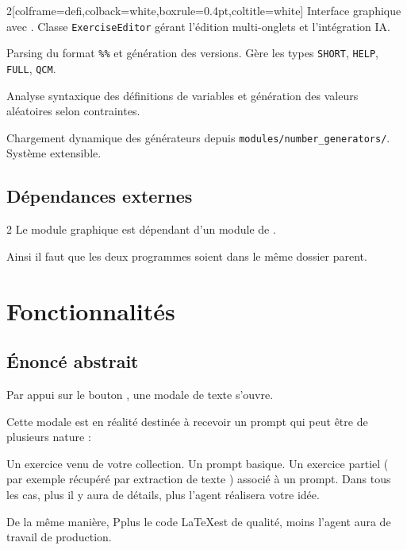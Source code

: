 \begin{MultiColonnes}{2}[colframe=defi,colback=white,boxrule=0.4pt,coltitle=white]
    \tcbitem[title=UI\_v2.py] Interface graphique avec . Classe \texttt{ExerciseEditor} gérant l'édition multi-onglets et l'intégration IA.

    \tcbitem[title=version\_maker.py] Parsing du format \texttt{\%\%} et génération des versions. Gère les types \texttt{SHORT}, \texttt{HELP}, \texttt{FULL}, \texttt{QCM}.

    \tcbitem[title=numbers\_def.py] Analyse syntaxique des définitions de variables et génération des valeurs aléatoires selon contraintes.

    \tcbitem[title=number\_generators\_manager.py] Chargement dynamique des générateurs depuis \texttt{modules/number\_generators/}. Système extensible.
\end{MultiColonnes} 

\subsection{Dépendances externes}

\begin{MultiColonnes}{2}
\tcbitem Le module graphique est dépendant d'un module de . 

Ainsi il faut que les deux programmes soient dans le même dossier parent. 
\tcbitem[halign=left,valign=top] 
\end{MultiColonnes}


\section{Fonctionnalités}

\subsection{\'Enoncé abstrait}

Par appui sur le bouton , une modale de texte s'ouvre. 

Cette modale est en réalité destinée à recevoir un prompt qui peut être de plusieurs nature : 

\begin{tcbenumerate}[2]
    \tcbitem Un exercice venu de votre collection. 
    \tcbitem Un prompt basique. 
    \tcbitem[raster multicolumn=2] Un exercice partiel ( par exemple récupéré par extraction de texte ) associé à un prompt. 
    \tcbitem[raster multicolumn=2,colframe=black,boxrule=0.4pt] Dans tous les cas, plus il y aura de détails, plus l'agent réalisera votre idée. 
    
    De la même manière, Pplus le code \LaTeX est de qualité, moins l'agent aura de travail de production. 
\end{tcbenumerate}

